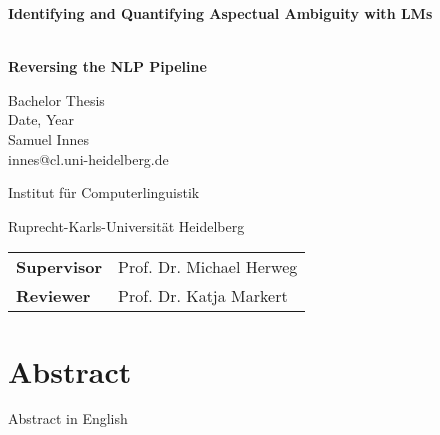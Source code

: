 
\sffamily
{} %
\pagestyle{plain}

\clearscrheadings\clearscrplain



\begin{center}

\begin{Huge}
\vspace{10mm}
\textbf{Identifying and Quantifying Aspectual Ambiguity with LMs}
\end{Huge}\\[5mm]
\textbf{\Large Reversing the NLP Pipeline}


\vspace{70mm}
\begin{large}
Bachelor Thesis\\
Date, Year\\

\vspace{1 cm}
Samuel Innes\\
innes@cl.uni-heidelberg.de\\
\end{large}
\vspace{2cm}

\begin{Large}
Institut für Computerlinguistik\\ %
\vspace{3mm}
\end{Large}{\Large Ruprecht-Karls-Universität Heidelberg}\\ %
\vspace{2cm}

\begin{tabular}{ll}
\textbf{Supervisor} & Prof. Dr. Michael Herweg\\
\textbf{Reviewer} & Prof. Dr. Katja Markert\\
\end{tabular}
\end{center}

\clearpage


\pagestyle{useheadings} %

\chapter*{Abstract}\label{c.abstract}
Abstract in English

